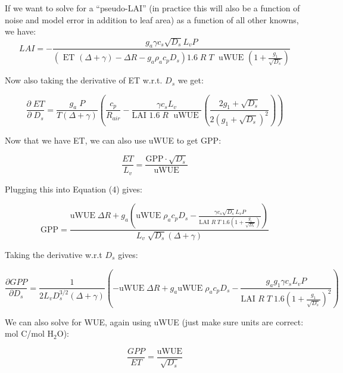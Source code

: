If we want to solve for a ``pseudo-LAI'' (in practice this will also be a function of noise and model error in addition to leaf area) as a function of all other knowns, we have:
\begin{equation}
LAI  = - \frac{g_a \gamma c_s \sqrt{D_s} L_v P }{ \left(\text{ ET } ( \Delta + \gamma) - \Delta R - g_a \rho_a c_p D_{s}\right) 1.6 \; R\; T\; \text{ uWUE } (1 + \frac{g_1}{\sqrt{D_s}})}
\end{equation}

Now also taking the derivative of ET w.r.t. $D_s$ we get:

\begin{equation}
\frac{\partial \;  ET}{\partial \; D_s} = \frac{g_a \; P}{T(\Delta + \gamma)}   \left(\frac{ c_p}{R_{air}} - \frac{\gamma c_s L_v  }{\text{LAI }1.6 \; R\; \text{ uWUE }} \left( \frac{2 g_1 + \sqrt{D_s}}{2 (g_1 + \sqrt{D_s})^2}\right) \right)
\end{equation}

Now that we have ET, we can also use uWUE to get GPP:

\begin{equation}
  \frac{ET}{L_v} = \frac{\text{GPP} \cdot \sqrt{D_s}}{  \text{uWUE}}
\end{equation}

Plugging this into Equation (4) gives:

\begin{equation}
  \text{GPP} = \frac{\text{uWUE}\; \Delta R + g_a \left( \text{uWUE}\; \rho_a c_p D_{s} - \frac{\gamma c_s \sqrt{D_s} L_v P }{\text{LAI } R \; T \; 1.6  (1 + \frac{g_1}{\sqrt{D_s}})} \right) }{L_v \; \sqrt{D_s} \left(\Delta + \gamma \right)}
\end{equation}

Taking the derivative w.r.t $D_s$ gives:

\begin{equation}
  \frac{\partial GPP}{\partial D_s} = \frac{1}{2 L_v D_s^{3/2} \left(\Delta + \gamma \right)} \left( -\text{uWUE}\; \Delta R + g_a \text{uWUE}\; \rho_a c_p  D_s - \frac{g_a g_1  \gamma c_s L_v P }{\text{LAI } R \; T \; 1.6 ( 1 + \frac{g_1}{\sqrt{D_s}})^2 } \right)
\end{equation}

We can also solve for WUE, again using uWUE (just make sure units are correct: mol C/mol H$_2$O):

\begin{equation}
\frac{GPP}{ET} = \frac{\text{uWUE}}{\sqrt{D_s}}
\end{equation}

